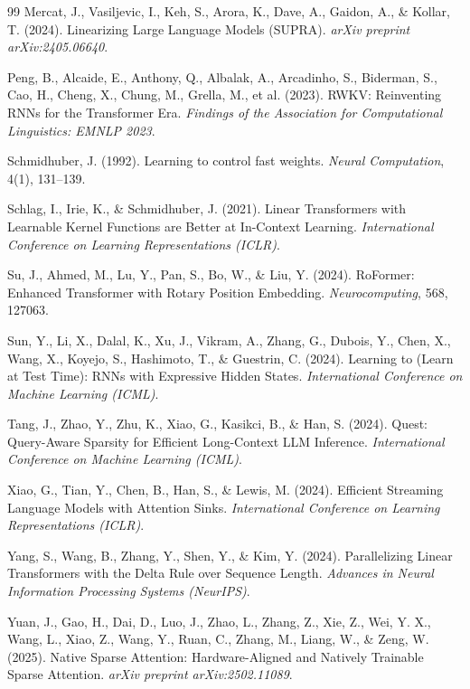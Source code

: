 \documentclass[11pt,a4paper]{article}
\begin{document}
\begin{thebibliography}{99}
Mercat, J., Vasiljevic, I., Keh, S., Arora, K., Dave, A., Gaidon, A., \& Kollar, T. (2024). Linearizing Large Language Models (SUPRA). \textit{arXiv preprint arXiv:2405.06640}.

Peng, B., Alcaide, E., Anthony, Q., Albalak, A., Arcadinho, S., Biderman, S., Cao, H., Cheng, X., Chung, M., Grella, M., et al. (2023). RWKV: Reinventing RNNs for the Transformer Era. \textit{Findings of the Association for Computational Linguistics: EMNLP 2023}.

Schmidhuber, J. (1992). Learning to control fast weights. \textit{Neural Computation}, 4(1), 131--139.

Schlag, I., Irie, K., \& Schmidhuber, J. (2021). Linear Transformers with Learnable Kernel Functions are Better at In-Context Learning. \textit{International Conference on Learning Representations (ICLR)}.

Su, J., Ahmed, M., Lu, Y., Pan, S., Bo, W., \& Liu, Y. (2024). RoFormer: Enhanced Transformer with Rotary Position Embedding. \textit{Neurocomputing}, 568, 127063.

Sun, Y., Li, X., Dalal, K., Xu, J., Vikram, A., Zhang, G., Dubois, Y., Chen, X., Wang, X., Koyejo, S., Hashimoto, T., \& Guestrin, C. (2024). Learning to (Learn at Test Time): RNNs with Expressive Hidden States. \textit{International Conference on Machine Learning (ICML)}.

Tang, J., Zhao, Y., Zhu, K., Xiao, G., Kasikci, B., \& Han, S. (2024). Quest: Query-Aware Sparsity for Efficient Long-Context LLM Inference. \textit{International Conference on Machine Learning (ICML)}.

Xiao, G., Tian, Y., Chen, B., Han, S., \& Lewis, M. (2024). Efficient Streaming Language Models with Attention Sinks. \textit{International Conference on Learning Representations (ICLR)}.

Yang, S., Wang, B., Zhang, Y., Shen, Y., \& Kim, Y. (2024). Parallelizing Linear Transformers with the Delta Rule over Sequence Length. \textit{Advances in Neural Information Processing Systems (NeurIPS)}.

Yuan, J., Gao, H., Dai, D., Luo, J., Zhao, L., Zhang, Z., Xie, Z., Wei, Y. X., Wang, L., Xiao, Z., Wang, Y., Ruan, C., Zhang, M., Liang, W., \& Zeng, W. (2025). Native Sparse Attention: Hardware-Aligned and Natively Trainable Sparse Attention. \textit{arXiv preprint arXiv:2502.11089}.


\end{thebibliography}
\end{document}
